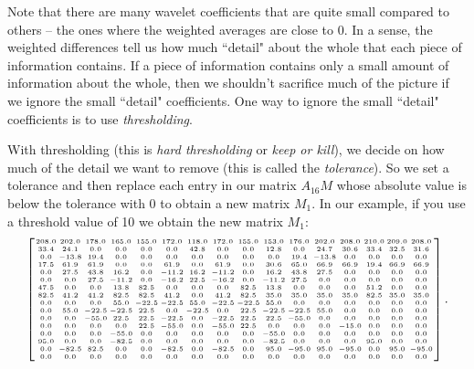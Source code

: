 Note that there are many wavelet coefficients that are quite small compared to others -- the ones where the weighted averages are close to 0. In a sense, the weighted differences tell us how much ``detail" about the whole that each piece of information contains. If a piece of information contains only a small amount of information about the whole, then we shouldn't sacrifice much of the picture if we ignore the small ``detail" coefficients. One way to ignore the small ``detail" coefficients is to use \emph{thresholding}.  

With thresholding (this is \emph{hard thresholding} or \emph{keep or kill}), we decide on how much of the detail we want to remove (this is called the \emph{tolerance}). So we set a tolerance and then replace each entry in our matrix $A_{16}M$ whose absolute value is below the tolerance with 0 to obtain a new matrix $M_1$. In our example, if you use a threshold value of 10 we obtain the new matrix $M_1$:
\[\left[\arraycolsep=1.0pt {\tiny{\begin {array}{cccccccccccccccc}  208.0& 202.0& 178.0& 165.0&
 155.0& 172.0& 118.0& 172.0& 155.0& 153.0& 176.0& 202.0& 208.0& 210.0&
 209.0& 208.0\\ 33.4& 24.1& 0.0& 0.0& 0.0& 0.0& 42.8
& 0.0& 0.0& 12.8& 0.0& 24.7& 30.6& 33.4& 32.5& 31.6
\\ 0.0&- 13.8& 19.4& 0.0& 0.0& 0.0& 0.0& 0.0& 0.0&
 0.0& 19.4&- 13.8& 0.0& 0.0& 0.0& 0.0\\ 17.5& 61.9&
 61.9& 0.0& 0.0& 61.9& 0.0& 61.9& 0.0& 30.6& 65.0& 66.9& 66.9& 19.4&
 66.9& 66.9\\ 0.0& 27.5& 43.8& 16.2& 0.0&- 11.2&
 16.2&- 11.2& 0.0& 16.2& 43.8& 27.5& 0.0& 0.0& 0.0& 0.0
\\ 0.0& 0.0& 27.5&- 11.2& 0.0&- 16.2& 22.5&- 16.2&
 0.0&- 11.2& 27.5& 0.0& 0.0& 0.0& 0.0& 0.0\\ 47.5&
 0.0& 0.0& 13.8& 82.5& 0.0& 0.0& 0.0& 82.5& 13.8& 0.0& 0.0& 0.0& 51.2&
 0.0& 0.0\\ 82.5& 41.2& 41.2& 82.5& 82.5& 41.2& 0.0&
 41.2& 82.5& 35.0& 35.0& 35.0& 35.0& 82.5& 35.0& 35.0
\\ 0.0& 0.0& 0.0& 55.0&- 22.5&- 22.5& 55.0&- 22.5&-
 22.5& 55.0& 0.0& 0.0& 0.0& 0.0& 0.0& 0.0\\ 0.0&
 55.0&- 22.5&- 22.5& 22.5& 0.0&- 22.5& 0.0& 22.5&- 22.5&- 22.5& 55.0&
 0.0& 0.0& 0.0& 0.0\\ 0.0& 0.0&- 55.0& 22.5& 22.5&-
 22.5& 0.0&- 22.5& 22.5& 22.5&- 55.0& 0.0& 0.0& 0.0& 0.0& 0.0
\\ 0.0& 0.0& 0.0& 0.0& 22.5&- 55.0& 0.0&- 55.0& 22.5
& 0.0& 0.0& 0.0&- 15.0& 0.0& 0.0& 0.0\\ 0.0& 0.0&
 0.0&- 55.0& 0.0& 0.0& 0.0& 0.0& 0.0&- 55.0& 0.0& 0.0& 0.0& 0.0& 0.0&
 0.0\\ 95.0& 0.0& 0.0&- 82.5& 0.0& 0.0& 0.0& 0.0&
 0.0&- 82.5& 0.0& 0.0& 0.0& 95.0& 0.0& 0.0\\ 0.0&-
 82.5& 82.5& 0.0& 0.0&- 82.5& 0.0&- 82.5& 0.0& 95.0&- 95.0& 95.0&-
 95.0& 0.0& 95.0&- 95.0\\ 0.0& 0.0& 0.0& 0.0& 0.0&
 0.0& 0.0& 0.0& 0.0& 0.0& 0.0& 0.0& 0.0& 0.0& 0.0& 0.0\end {array} }}
 \right]. \]

